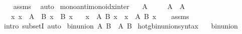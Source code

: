 \begin{isabellebody}
%
\isadelimproof
\ \ %
\endisadelimproof
%
\isatagproof
{}\isamarkupfalse%
\ assms\ \isamarkupfalse%
\ auto%
\endisatagproof
{\isafoldproof}%
%
\isadelimproof
\isanewline
%
\endisadelimproof
\isanewline
{}\isamarkupfalse%
\ mono{\isacharunderscore}{\kern0pt}antimono{\isacharunderscore}{\kern0pt}idx{\isacharunderscore}{\kern0pt}inter{\isacharcolon}{\kern0pt}\isanewline
\ \ \ {\isachardoublequoteopen}A\ {\isasymnoteq}\ {\isacharbraceleft}{\kern0pt}{\isacharbraceright}{\kern0pt}{\isachardoublequoteclose}\isanewline
\ \ \ {\isachardoublequoteopen}A\ {\isasymsubseteq}\ A{\isacharprime}{\kern0pt}{\isachardoublequoteclose}\isanewline
\ \ \ {\isachardoublequoteopen}{\isasymAnd}x{\isachardot}{\kern0pt}\ x\ {\isasymin}\ A\ {\isasymLongrightarrow}\ B{\isacharprime}{\kern0pt}\ x\ {\isasymsubseteq}\ B\ x{\isachardoublequoteclose}\isanewline
\ \ \ {\isachardoublequoteopen}{\isacharparenleft}{\kern0pt}{\isasymInter}x\ {\isasymin}\ A{\isacharprime}{\kern0pt}{\isachardot}{\kern0pt}\ B{\isacharprime}{\kern0pt}\ x{\isacharparenright}{\kern0pt}\ {\isasymsubseteq}\ {\isacharparenleft}{\kern0pt}{\isasymInter}x\ {\isasymin}\ A{\isachardot}{\kern0pt}\ B\ x{\isacharparenright}{\kern0pt}{\isachardoublequoteclose}\isanewline
%
\isadelimproof
\ \ %
\endisadelimproof
%
\isatagproof
{}\isamarkupfalse%
\ assms\ \isamarkupfalse%
\ {\isacharparenleft}{\kern0pt}intro\ subsetI{\isacharparenright}{\kern0pt}\ auto%
\endisatagproof
{\isafoldproof}%
%
\isadelimproof
%
\endisadelimproof
%
\isadelimdocument
%
\endisadelimdocument
%
\isatagdocument
%
\isamarkuptrue%
%
\endisatagdocument
{\isafolddocument}%
%
\isadelimdocument
%
\endisadelimdocument
{}\isamarkupfalse%
\ {\isachardoublequoteopen}bin{\isacharunderscore}{\kern0pt}union\ A\ B\ {\isasymequiv}\ {\isasymUnion}{\isacharbraceleft}{\kern0pt}A{\isacharcomma}{\kern0pt}\ B{\isacharbraceright}{\kern0pt}{\isachardoublequoteclose}\isanewline
\isanewline
{}\isamarkupfalse%
\ hotg{\isacharunderscore}{\kern0pt}bin{\isacharunderscore}{\kern0pt}union{\isacharunderscore}{\kern0pt}syntax\ \ \isamarkupfalse%
\ bin{\isacharunderscore}{\kern0pt}union\ {\isacharparenleft}{\kern0pt}\ {\isachardoublequoteopen}{\isasymunion}{\isachardoublequoteclose}\ {}{}{\isacharparenright}{\kern0pt}\ \isamarkupfalse%
\isanewline
{}\isamarkupfalse%

\end{isabellebody}
